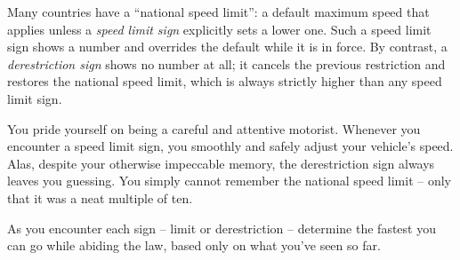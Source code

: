 



Many countries have a “national speed limit”: 
a default maximum speed that applies unless a \emph{speed limit sign} explicitly sets a lower one.
Such a speed limit sign shows a number and overrides the default while it is in force.
By contrast, a \emph{derestriction sign} shows no number at all; it cancels the previous restriction and restores the national speed limit, which is always strictly higher than any speed limit sign.

You pride yourself on being a careful and attentive motorist.
Whenever you encounter a speed limit sign, you smoothly and safely adjust your vehicle's speed.
Alas, despite your otherwise impeccable memory, the derestriction sign always leaves you guessing.
You simply cannot remember the national speed limit -- only that it was a neat multiple of ten.

As you encounter each sign -- limit or derestriction -- determine the fastest you can go while abiding the law, based only on what you've seen so far.


